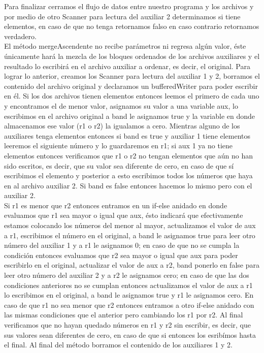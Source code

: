 \documentclass[12pt,letterpaper]{article}
\begin{document}
\begin{large}
Para finalizar cerramos el flujo de datos entre nuestro programa y los archivos y por medio de otro Scanner para lectura del auxiliar 2 determinamos si tiene elementos, en caso de que no tenga retornamos falso en caso contrario retornamos verdadero.\\
El método mergeAscendente no recibe parámetros ni regresa algún valor, éste únicamente hará la mezcla de los bloques ordenados de los archivos auxiliares y el resultado lo escribirá en el archivo auxiliar a ordenar, es decir, el original. \newpage
Para lograr lo anterior, creamos los Scanner para lectura del auxiliar 1 y 2, borramos el contenido del archivo original y declaramos un bufferedWriter para poder escribir en él. Si los dos archivos tienen elementos entonces leemos el primero de cada uno y encontramos el de menor valor, asignamos su valor a una variable aux, lo escribimos en el archivo original a band le asignamos true y la variable en donde almacenamos ese valor (r1 o r2) la igualamos a cero. Mientras alguno de los auxiliares tenga elementos entonces si band es true y auxiliar 1 tiene elementos leeremos el siguiente número y lo guardaremos en r1; si aux 1 ya no tiene elementos entonces verificamos que r1 o r2 no tengan elementos que aún no han sido escritos, es decir, que su valor sea diferente de cero, en caso de que sí escribimos el elemento y posterior a esto escribimos todos los números que haya en al archivo auxiliar 2. Si band es false entonces hacemos lo mismo pero con el auxiliar 2.\\
Si r1 es menor que r2 entonces entramos en un if-else anidado en donde evaluamos que r1 sea mayor o igual que aux, ésto indicará que efectivamente estamos colocando los números del menor al mayor, actualizamos el valor de aux a r1, escribimos el número en el original, a band le asignamos true para leer otro número del auxiliar 1 y a r1 le asignamos 0; en caso de que no se cumpla la condición entonces evaluamos que r2 sea mayor o igual que aux para poder escribirlo en el original, actualizar el valor de aux a r2, band ponerlo en false para leer otro número del auxiliar 2 y a r2 le asignamos cero; en caso de que las dos condiciones anteriores no se cumplan entonces actualizamos el valor de aux a r1 lo escribimos en el original, a band le asignamos true y r1 le asignamos cero. En caso de que r1 no sea menor que r2 entonces entramos a otro if-else anidado con las mismas condiciones que el anterior pero cambiando los r1 por r2. Al final verificamos que no hayan quedado números en r1 y r2 sin escribir, es decir, que sus valores sean diferentes de cero, en caso de que si entonces los esribímos hasta el final. Al final del método borramos el contenido de los auxiliares 1 y 2.\\

\end{large}
\end{document}
